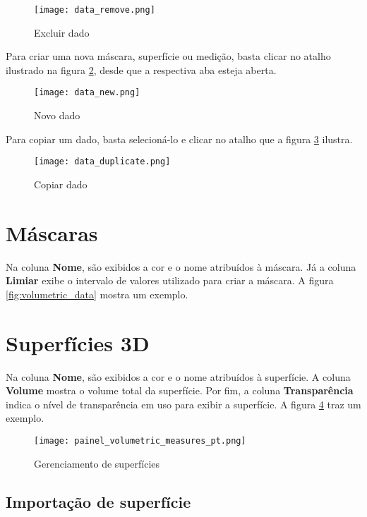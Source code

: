 \begin{figure}[!htb]
\centering
\texttt{[image: data\_remove.png]}
\caption{Excluir dado}
\label{fig:delete_data}
\end{figure}

Para criar uma nova máscara, superfície ou medição, basta clicar no atalho ilustrado na figura
\ref{fig:new_data}, desde que a respectiva aba esteja aberta.

\begin{figure}[!htb]
\centering
\texttt{[image: data\_new.png]}
\caption{Novo dado}
\label{fig:new_data}
\end{figure}

Para copiar um dado, basta selecioná-lo e clicar no atalho que a figura \ref{fig:duplicate_data}
ilustra.

\begin{figure}[!htb]
\centering
\texttt{[image: data\_duplicate.png]}
\caption{Copiar dado}
\label{fig:duplicate_data}
\end{figure}


\newpage


\section{Máscaras}

Na coluna \textbf{Nome}, são exibidos a cor e o nome atribuídos à máscara. Já a coluna
\textbf{Limiar} exibe o intervalo de valores utilizado para criar a máscara. A figura
\ref{fig:volumetric_data} mostra um exemplo.

\section{Superfícies 3D}

Na coluna \textbf{Nome}, são exibidos a cor e o nome atribuídos à superfície. A coluna 
\textbf{Volume} mostra o volume total da superfície. Por fim, a coluna \textbf{Transparência}
indica o nível de transparência em uso para exibir a superfície. A figura \ref{fig:surface_manager}
traz um exemplo.

\begin{figure}[!htb]
\centering
\texttt{[image: painel\_volumetric\_measures\_pt.png]}
\caption{Gerenciamento de superfícies}
\label{fig:surface_manager}
\end{figure}

\subsection{Importação de superfície}

